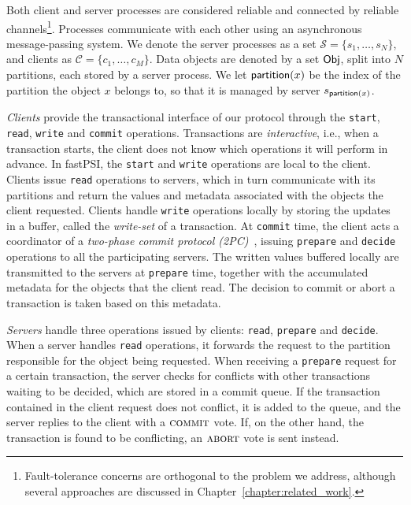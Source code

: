 Both client and server processes are considered reliable and connected by reliable channels\footnote{Fault-tolerance concerns are orthogonal to the problem we address, although several approaches are discussed in Chapter~\ref{chapter:related_work}.}. Processes communicate with each other using an asynchronous message-passing system. We denote the server processes as a set $\mathcal{S} = \{s_1, \dots, s_N\}$, and clients as $\mathcal{C} = \{c_1, \dots, c_M\}$. Data objects are denoted by a set ${\sf Obj}$, split into $N$ partitions, each stored by a server process. We let $\mathsf{partition}(x)$ be the index of the partition the object $x$ belongs to, so that it is managed by server $s_{\mathsf{partition}(x)}$.

\emph{Clients} provide the transactional interface of our protocol through the \texttt{start}, \texttt{read}, \texttt{write} and \texttt{commit} operations. Transactions are \emph{interactive}, i.e., when a transaction starts, the client does not know which operations it will perform in advance. In fastPSI, the \texttt{start} and \texttt{write} operations are local to the client. Clients issue \texttt{read} operations to servers, which in turn communicate with its partitions and return the values and metadata associated with the objects the client requested. Clients handle \texttt{write} operations locally by storing the updates in a buffer, called the \emph{write-set} of a transaction. At \texttt{commit} time, the client acts a coordinator of a \emph{two-phase commit protocol (2PC)}~\citep{bernstein_concurrency}, issuing \texttt{prepare} and \texttt{decide} operations to all the participating servers. The written values buffered locally are transmitted to the servers at \texttt{prepare} time, together with the accumulated metadata for the objects that the client read. The decision to commit or abort a transaction is taken based on this metadata.

\emph{Servers} handle three operations issued by clients: \texttt{read}, \texttt{prepare} and \texttt{decide}. When a server handles \texttt{read} operations, it forwards the request to the partition responsible for the object being requested. When receiving a \texttt{prepare} request for a certain transaction, the server checks for conflicts with other transactions waiting to be decided, which are stored in a commit queue. If the transaction contained in the client request does not conflict, it is added to the queue, and the server replies to the client with a $\text{\sc commit}$ vote. If, on the other hand, the transaction is found to be conflicting, an $\text{\sc abort}$ vote is sent instead.

